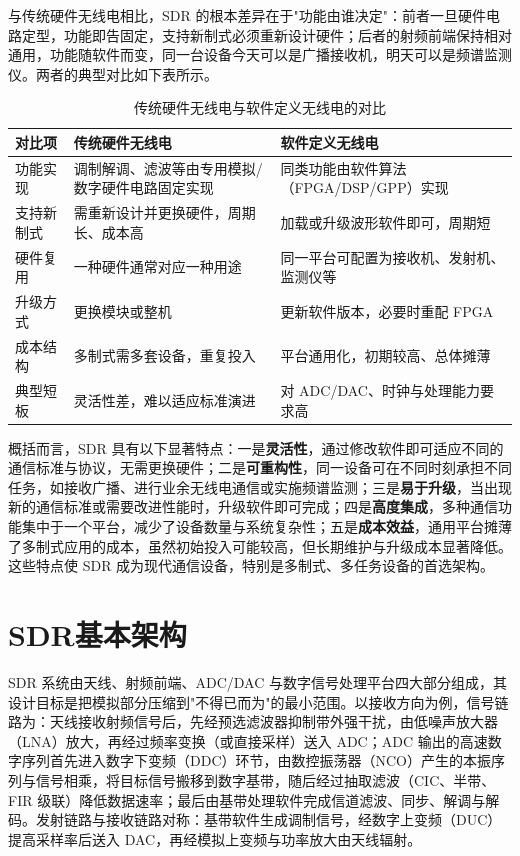 与传统硬件无线电相比，SDR 的根本差异在于"功能由谁决定"：前者一旦硬件电路定型，功能即告固定，支持新制式必须重新设计硬件；后者的射频前端保持相对通用，功能随软件而变，同一台设备今天可以是广播接收机，明天可以是频谱监测仪。两者的典型对比如下表所示。

\begin{table}[htbp]
\centering
\caption{传统硬件无线电与软件定义无线电的对比}
\label{tab:sdr_compare}
\begin{tabular}{|p{2.2cm}|p{5.2cm}|p{6.2cm}|}
\hline
\textbf{对比项} & \textbf{传统硬件无线电} & \textbf{软件定义无线电} \\
\hline
功能实现 & 调制解调、滤波等由专用模拟/数字硬件电路固定实现 & 同类功能由软件算法（FPGA/DSP/GPP）实现 \\
\hline
支持新制式 & 需重新设计并更换硬件，周期长、成本高 & 加载或升级波形软件即可，周期短 \\
\hline
硬件复用 & 一种硬件通常对应一种用途 & 同一平台可配置为接收机、发射机、监测仪等 \\
\hline
升级方式 & 更换模块或整机 & 更新软件版本，必要时重配 FPGA \\
\hline
成本结构 & 多制式需多套设备，重复投入 & 平台通用化，初期较高、总体摊薄 \\
\hline
典型短板 & 灵活性差，难以适应标准演进 & 对 ADC/DAC、时钟与处理能力要求高 \\
\hline
\end{tabular}
\end{table}

概括而言，SDR 具有以下显著特点：一是\textbf{灵活性}，通过修改软件即可适应不同的通信标准与协议，无需更换硬件；二是\textbf{可重构性}，同一设备可在不同时刻承担不同任务，如接收广播、进行业余无线电通信或实施频谱监测；三是\textbf{易于升级}，当出现新的通信标准或需要改进性能时，升级软件即可完成；四是\textbf{高度集成}，多种通信功能集中于一个平台，减少了设备数量与系统复杂性；五是\textbf{成本效益}，通用平台摊薄了多制式应用的成本，虽然初始投入可能较高，但长期维护与升级成本显著降低。这些特点使 SDR 成为现代通信设备，特别是多制式、多任务设备的首选架构。

\section{SDR基本架构}
\label{sec:sdr_architecture}

SDR 系统由天线、射频前端、ADC/DAC 与数字信号处理平台四大部分组成，其设计目标是把模拟部分压缩到"不得已而为"的最小范围。以接收方向为例，信号链路为：天线接收射频信号后，先经预选滤波器抑制带外强干扰，由低噪声放大器（LNA）放大，再经过频率变换（或直接采样）送入 ADC；ADC 输出的高速数字序列首先进入数字下变频（DDC）环节，由数控振荡器（NCO）产生的本振序列与信号相乘，将目标信号搬移到数字基带，随后经过抽取滤波（CIC、半带、FIR 级联）降低数据速率；最后由基带处理软件完成信道滤波、同步、解调与解码。发射链路与接收链路对称：基带软件生成调制信号，经数字上变频（DUC）提高采样率后送入 DAC，再经模拟上变频与功率放大由天线辐射。

